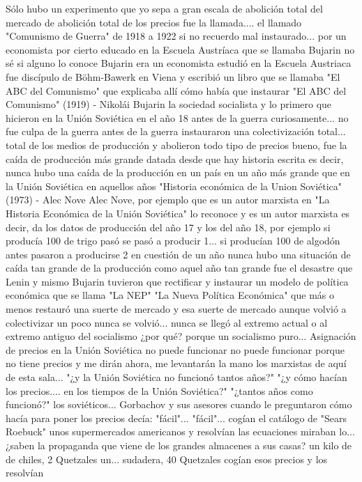 Sólo hubo un experimento que yo sepa a gran escala de abolición total del mercado de abolición total de los precios fue la llamada.... el llamado "Comunismo de Guerra" de 1918 a 1922 si no recuerdo mal
instaurado... por un economista por cierto educado en la Escuela Austríaca que se llamaba Bujarin no sé si alguno lo conoce
Bujarin era un economista estudió en la Escuela Austriaca fue discípulo de Böhm-Bawerk en Viena
y escribió un libro que se llamaba "El ABC del Comunismo" que explicaba allí cómo había que instaurar
"El ABC del Comunismo" (1919) - Nikolái Bujarin
la sociedad socialista y lo primero que hicieron en la Unión Soviética en el año 18 antes de la guerra curiosamente...
no fue culpa de la guerra antes de la guerra instauraron una colectivización total... total
de los medios de producción y abolieron todo tipo de precios bueno, fue la caída de producción
más grande datada desde que hay historia escrita es decir, nunca hubo una caída
de la producción en un país en un año más grande que en la Unión Soviética en aquellos años
"Historia económica de la Union Soviética" (1973) - Alec Nove
Alec Nove, por ejemplo que es un autor marxista en "La Historia Económica de la Unión Soviética" lo reconoce y es un autor marxista es decir, da los datos de producción del año 17
y los del año 18, por ejemplo si producía 100 de trigo pasó se pasó a producir 1... si producían 100 de algodón antes
pasaron a producirse 2 en cuestión de un año nunca hubo una situación de caída tan grande
de la producción como aquel año tan grande fue el desastre que Lenin y mismo Bujarin
tuvieron que rectificar y instaurar un modelo de política económica que se llama "La NEP" "La Nueva Política Económica"
que más o menos restauró una suerte de mercado y esa suerte de mercado aunque volvió a colectivizar un poco
nunca se volvió... nunca se llegó al extremo actual o al extremo antiguo del socialismo ¿por qué? porque un socialismo puro...
Asignación de precios en la Unión Soviética
no puede funcionar no puede funcionar porque no tiene precios y me dirán ahora, me levantarán la mano
los marxistas de aquí de esta sala... "¿y la Unión Soviética no funcionó tantos años?"
"¿y cómo hacían los precios.... en los tiempos de la Unión Soviética?" "¿tantos años como funcionó?" los soviéticos...
Gorbachov y sus asesores cuando le preguntaron cómo hacía para poner los precios
decía: "fácil"... "fácil"... cogían el catálogo de "Sears Roebuck" unos supermercados americanos
y resolvían las ecuaciones miraban lo... ¿saben la propaganda que viene de los grandes almacenes a sus casas?
un kilo de de chiles, 2 Quetzales un... sudadera, 40 Quetzales cogían esos precios y los resolvían
